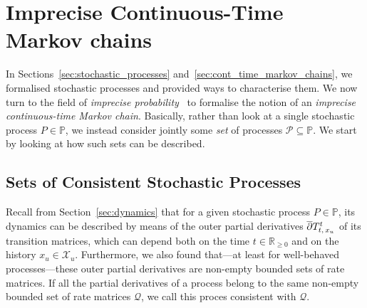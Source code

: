 \documentclass[10pt,a4paper]{paper}
\theoremstyle{definition}
\newtheorem{exmp}{Example}%
\newtheorem{proposition}[theorem]{Proposition}
\newcommand{\reals}{\mathbb{R}}
\newcommand{\realsnonneg}{\reals_{\geq 0}}
\newcommand{\states}{\mathcal{X}}
\newcommand{\processes}{\mathbb{P}}
\newcommand{\wmprocesses}{\processes^{\mathrm{WM}}}
\newcommand{\rateset}{\mathcal{Q}}
\newcommand{\exampleend}{\hfill$\Diamond$}
\begin{document}







\section{Imprecise Continuous-Time Markov chains}
\label{sec:iCTMC}

In Sections~\ref{sec:stochastic_processes} and~\ref{sec:cont_time_markov_chains}, we formalised stochastic processes and provided ways to characterise them. We now turn to the field of \emph{imprecise probability}~\cite{augustin2013:itip,Walley:1991vk} to formalise the notion of an \emph{imprecise continuous-time Markov chain}. Basically, rather than look at a single stochastic process $P\in\processes$, we instead consider jointly some \emph{set} of processes $\mathcal{P}\subseteq\processes$. We start by looking at how such sets can be described.

\subsection{Sets of Consistent Stochastic Processes}

Recall from Section~\ref{sec:dynamics} that for a given stochastic process $P\in\processes$, its dynamics can be described by means of the outer partial derivatives $\smash{\overline{\partial}}T_{t,\,x_u}^t$ of its transition matrices, which can depend both on the time $t\in\realsnonneg$ and on the history $x_u\in\states_u$. %
 Furthermore, we also found that---at least for well-behaved processes---these outer partial derivatives are non-empty bounded sets of rate matrices. If all the partial derivatives of a process belong to the same non-empty bounded set of rate matrices $\rateset$, we call this proces consistent with $\rateset$.
\end{document}
